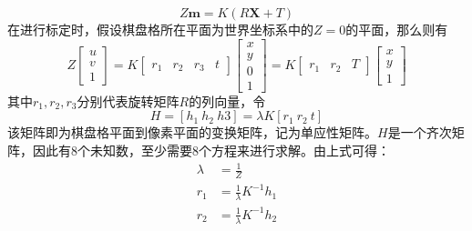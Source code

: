 \begin{equation}
    Z \bm{m} = K(R\bm{X} + T)
\end{equation}
在进行标定时，假设棋盘格所在平面为世界坐标系中的\(Z=0\)的平面，那么则有
\begin{equation}
    Z\left[ \begin{array}{c} u \\ v \\ 1 \end{array} \right] = K\left[
        \begin{array}{cccc} r_1 & r_2 & r_3 & t\end{array}
        \right]
    \left[
        \begin{array}{c}x \\y \\0 \\1\end{array}
        \right]=K
    \left[
        \begin{array}{cccc} r_1 & r_2 & T\end{array}
        \right]
    \left[
        \begin{array}{c}x \\y \\1\end{array}
        \right]
\end{equation}
其中\(r_1,r_2,r_3\)分别代表旋转矩阵\(R\)的列向量，令
\begin{equation}
    H=[h_1\ h_2\ h3] = \lambda K[r_1\ r_2\ t]
\end{equation}
该矩阵即为棋盘格平面到像素平面的变换矩阵，记为单应性矩阵。\(H\)是一个齐次矩阵，因此有8个未知数，至少需要8个方程来进行求解。由上式可得：
\begin{align}
    \lambda & = \frac{1}{Z}                 \\
    r_1     & = \frac{1}{\lambda} K^{-1}h_1 \\
    r_2     & = \frac{1}{\lambda} K^{-1}h_2
\end{align}

